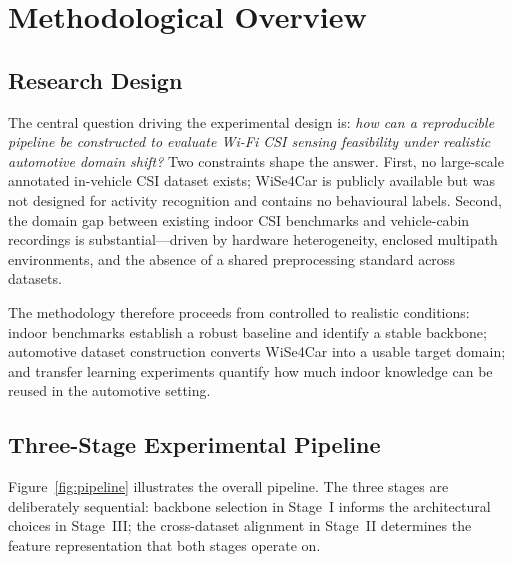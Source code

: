 \documentclass[english,bibtex]{kththesis}
\begin{document}
\section{Methodological Overview}
\label{sec:overview}

\subsection{Research Design}

The central question driving the experimental design is: \textit{how can a reproducible pipeline be constructed to evaluate Wi-Fi CSI sensing feasibility under realistic automotive domain shift?} Two constraints shape the answer. First, no large-scale annotated in-vehicle CSI dataset exists; WiSe4Car is publicly available but was not designed for activity recognition and contains no behavioural labels. Second, the domain gap between existing indoor CSI benchmarks and vehicle-cabin recordings is substantial---driven by hardware heterogeneity, enclosed multipath environments, and the absence of a shared preprocessing standard across datasets.

The methodology therefore proceeds from controlled to realistic conditions: indoor benchmarks establish a robust baseline and identify a stable backbone; automotive dataset construction converts WiSe4Car into a usable target domain; and transfer learning experiments quantify how much indoor knowledge can be reused in the automotive setting.

\subsection{Three-Stage Experimental Pipeline}

Figure~\ref{fig:pipeline} illustrates the overall pipeline. The three stages are deliberately sequential: backbone selection in Stage~I informs the architectural choices in Stage~III; the cross-dataset alignment in Stage~II determines the feature representation that both stages operate on.
\end{document}
